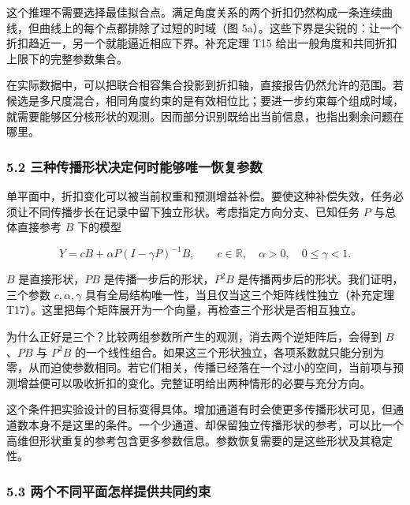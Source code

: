 \documentclass[11pt,a4paper]{article}
\begin{document}
这个推理不需要选择最佳拟合点。满足角度关系的两个折扣仍然构成一条连续曲线，但曲线上的每个点都排除了过短的时域（图
5a）。这些下界是尖锐的：让一个折扣趋近一，另一个就能逼近相应下界。补充定理
T15 给出一般角度和共同折扣上限下的完整参数集合。

在实际数据中，可以把联合相容集合投影到折扣轴，直接报告仍然允许的范围。若候选是多尺度混合，相同角度约束的是有效相位比；要进一步约束每个组成时域，就需要能够区分核形状的观测。因而部分识别既给出当前信息，也指出剩余问题在哪里。

\subsubsection{5.2
三种传播形状决定何时能够唯一恢复参数}\label{ux4e09ux79cdux4f20ux64adux5f62ux72b6ux51b3ux5b9aux4f55ux65f6ux80fdux591fux552fux4e00ux6062ux590dux53c2ux6570}

\par
\noindent\begin{minipage}{\linewidth}

单平面中，折扣变化可以被当前权重和预测增益补偿。要使这种补偿失效，任务必须让不同传播步长在记录中留下独立形状。考虑指定方向分支、已知任务
\(P\) 与总体直接参考 \(B\) 下的模型

\[
Y=cB+\alpha P(I-\gamma P)^{-1}B,
\qquad c\in\mathbb R,\quad\alpha>0,\quad0\leq\gamma<1.
\]

\end{minipage}\par

\(B\) 是直接形状，\(PB\) 是传播一步后的形状，\(P^2B\)
是传播两步后的形状。我们证明，三个参数 \(c,\alpha,\gamma\)
具有全局结构唯一性，当且仅当这三个矩阵线性独立（补充定理
T17）。这里把每个矩阵展开为一个向量，再检查三个形状是否相互独立。

为什么正好是三个？比较两组参数所产生的观测，消去两个逆矩阵后，会得到
\(B\)、\(PB\) 与 \(P^2B\)
的一个线性组合。如果这三个形状独立，各项系数就只能分别为零，从而迫使参数相同。若它们相关，传播已经落在一个过小的空间，当前项与预测增益便可以吸收折扣的变化。完整证明给出两种情形的必要与充分方向。

这个条件把实验设计的目标变得具体。增加通道有时会使更多传播形状可见，但通道数本身不是这里的条件。一个少通道、却保留独立传播形状的参考，可以比一个高维但形状重复的参考包含更多参数信息。参数恢复需要的是这些形状及其稳定性。

\subsubsection{5.3
两个不同平面怎样提供共同约束}\label{ux4e24ux4e2aux4e0dux540cux5e73ux9762ux600eux6837ux63d0ux4f9bux5171ux540cux7ea6ux675f}
\end{document}
